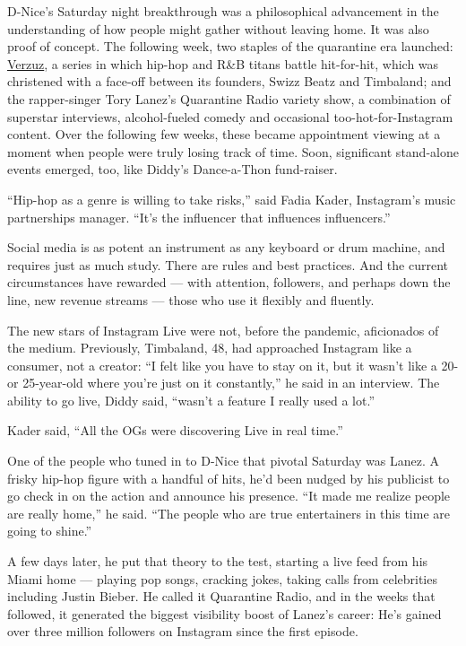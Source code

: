 D-Nice's Saturday night breakthrough was a philosophical advancement in
the understanding of how people might gather without leaving home. It
was also proof of concept. The following week, two staples of the
quarantine era launched:
\href{https://www.instagram.com/verzuz.tv/?hl=en}{Verzuz}, a series in
which hip-hop and R\&B titans battle hit-for-hit, which was christened
with a face-off between its founders, Swizz Beatz and Timbaland; and the
rapper-singer Tory Lanez's Quarantine Radio variety show, a combination
of superstar interviews, alcohol-fueled comedy and occasional
too-hot-for-Instagram content. Over the following few weeks, these
became appointment viewing at a moment when people were truly losing
track of time. Soon, significant stand-alone events emerged, too, like
Diddy's Dance-a-Thon fund-raiser.

``Hip-hop as a genre is willing to take risks,'' said Fadia Kader,
Instagram's music partnerships manager. ``It's the influencer that
influences influencers.''

Social media is as potent an instrument as any keyboard or drum machine,
and requires just as much study. There are rules and best practices. And
the current circumstances have rewarded --- with attention, followers,
and perhaps down the line, new revenue streams --- those who use it
flexibly and fluently.

The new stars of Instagram Live were not, before the pandemic,
aficionados of the medium. Previously, Timbaland, 48, had approached
Instagram like a consumer, not a creator: ``I felt like you have to stay
on it, but it wasn't like a 20- or 25-year-old where you're just on it
constantly,'' he said in an interview. The ability to go live, Diddy
said, ``wasn't a feature I really used a lot.''

Kader said, ``All the OGs were discovering Live in real time.''

One of the people who tuned in to D-Nice that pivotal Saturday was
Lanez. A frisky hip-hop figure with a handful of hits, he'd been nudged
by his publicist to go check in on the action and announce his presence.
``It made me realize people are really home,'' he said. ``The people who
are true entertainers in this time are going to shine.''

A few days later, he put that theory to the test, starting a live feed
from his Miami home --- playing pop songs, cracking jokes, taking calls
from celebrities including Justin Bieber. He called it Quarantine Radio,
and in the weeks that followed, it generated the biggest visibility
boost of Lanez's career: He's gained over three million followers on
Instagram since the first episode.

